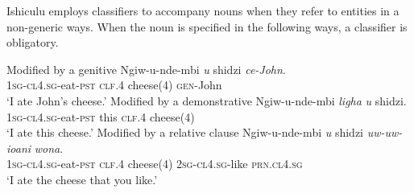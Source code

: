 Ishiculu employs classifiers to accompany nouns when they refer to entities in a non-generic ways. When the noun is specified in the following ways, a classifier is obligatory.

\begin{exe}
\ex Modified by a genitive
\gll Ngiw-u-nde-mbi \textit{u} shidzi \textit{ce-John}. \\
\textsc{1sg}-\textsc{cl4.sg}-eat-\textsc{pst} \textsc{clf.4} cheese(4) \textsc{gen}-John \\
\trans `I ate John's cheese.'
\ex Modified by a demonstrative
\gll Ngiw-u-nde-mbi \textit{ligha} \textit{u} shidzi. \\
\textsc{1sg}-\textsc{cl4.sg}-eat-\textsc{pst} this \textsc{clf.4} cheese(4) \\
\trans `I ate this cheese.'
\ex Modified by a relative clause
\gll Ngiw-u-nde-mbi \textit{u} shidzi \textit{uw-uw-ioani} \textit{wona}. \\
\textsc{1sg}-\textsc{cl4.sg}-eat-\textsc{pst} \textsc{clf.4} cheese(4) \textsc{2sg}-\textsc{cl4.sg}-like \textsc{prn.cl4.sg} \\
\trans `I ate the cheese that you like.'
\end{exe}

